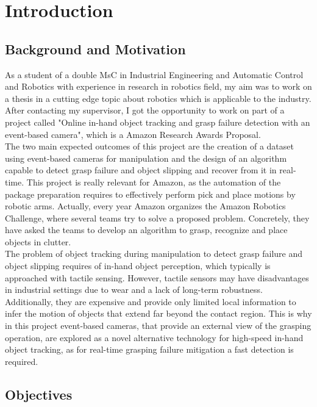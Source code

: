\cleardoublepage\chapter{Introduction}\label{sec:introduction}

\section{Background and Motivation}

As a student of a double MsC in Industrial Engineering and Automatic Control and Robotics with experience in research in robotics field, my aim was to work on a thesis in a cutting edge topic about robotics which is applicable to the industry. After contacting my supervisor, I got the opportunity to work on part of a project called "Online in-hand object tracking and grasp failure detection with an event-based camera", which is a Amazon Research Awards Proposal.\\

The two main expected outcomes of this project are the creation of a dataset using event-based cameras for manipulation and the design of an algorithm capable to detect grasp failure and object slipping and recover from it in real-time. This project is really relevant for Amazon, as the automation of the package preparation requires to effectively perform pick and place motions by robotic arms. Actually, every year Amazon organizes the Amazon Robotics Challenge, where several teams try to solve a proposed problem. Concretely, they have asked the teams to develop an algorithm to grasp, recognize and place objects in clutter.\\

The problem of object tracking during manipulation to detect grasp failure and object slipping requires of in-hand object perception, which typically is approached with tactile sensing. However, tactile sensors may have disadvantages in industrial settings due to wear and a lack of long-term robustness. Additionally, they are expensive and provide only limited local information to infer the motion of objects that extend far beyond the contact region. This is why in this project event-based cameras, that provide an external view of the grasping operation, are explored as a novel alternative technology for high-speed in-hand object tracking, as for real-time grasping failure mitigation a fast detection is required.

\section{Objectives}

